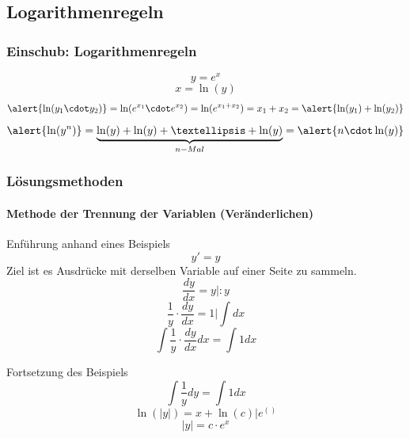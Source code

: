 \documentclass[
	11pt, %
]{beamer}
\begin{document}
\subsection{Logarithmenregeln}
\begin{frame}
	\frametitle{Einschub: Logarithmenregeln}
	\begin{equation}
		y=e^x
	\end{equation}
	\begin{equation}
		x=\ln(y)
	\end{equation}
	\begin{equation}
	\alert{\ln(y_1\cdot y_2)}=\ln(e^{x_1}\cdot e^{x_2})=\ln(e^{x_1+x_2})=x_1+x_2=\alert{\ln(y_1)+\ln(y_2)}
	\end{equation}
	\begin{equation}
		\alert{\ln(y^n)}=\underbrace{\ln(y)+ \ln(y) + \ldots + \ln(y)}_{n-Mal}=\alert{n\cdot \ln(y)}
	\end{equation}
\end{frame}
\begin{frame}
	\frametitle{L\"osungsmethoden}
	\framesubtitle{Methode der Trennung der Variablen (Ver\"anderlichen)}
	\begin{exampleblock}{Enf\"uhrung anhand eines Beispiels}
		\begin{equation}
			y'=y
		\end{equation}
Ziel ist es Ausdr\"ucke mit derselben Variable auf einer Seite zu sammeln.
		\begin{equation}
			\frac{dy}{dx}=y\big|:y
		\end{equation}
		\begin{equation}
			\frac{1}{y}\cdot\frac{dy}{dx}=1\bigg|\int dx
		\end{equation}
		\begin{equation}
			\int\frac{1}{y}\cdot\frac{dy}{dx}dx=\int 1dx
		\end{equation}
	\end{exampleblock}
\end{frame}
\begin{frame}
	\begin{exampleblock}{Fortsetzung des Beispiels}
		\begin{equation}
			\int\frac{1}{y}dy=\int 1dx
		\end{equation}
		\begin{equation}
			\ln(\left|y\right|)=x+\ln(c)\big| e^{()}
		\end{equation}
		\begin{equation}
			\left|y\right|=c\cdot e^x
		\end{equation}
	\end{exampleblock}
\end{frame}
\end{document}
